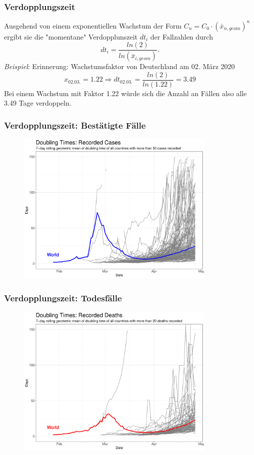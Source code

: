 \documentclass{beamer}
\begin{document}
\begin{frame}
	\frametitle{Verdopplungszeit}
	Ausgehend von einem exponentiellen Wachstum der Form $C_n = C_0 \cdot (\bar{x}_{n, geom})^{n}$ ergibt sie die "momentane" Verdopplunszeit $dt_i$ der Fallzahlen durch $$dt_i = \frac{ln(2)}{ln(\bar{x}_{i, geom})}.$$
	\pause
	\emph{Beispiel}: Erinnerung: Wachstumsfaktor von Deutschland am 02. März 2020 $$x_{02.03.} = 1.22 \Rightarrow dt_{02.03.} = \frac{ln(2)}{ln(1.22)} = 3.49$$ 
	\pause
	Bei einem Wachstum mit Faktor 1.22 würde sich die Anzahl an Fällen also alle 3.49 Tage verdoppeln.
	
\end{frame}

\begin{frame}
	\frametitle{Verdopplungszeit: Bestätigte Fälle}
	\begin{figure}
		\centering
		\includegraphics[width = 270pt]{DT_confirmed}
	\end{figure}
\end{frame}

\begin{frame}
	\frametitle{Verdopplungszeit: Todesfälle}
	\begin{figure}
		\centering
		\includegraphics[width = 270pt]{DT_deaths}
	\end{figure}
\end{frame}
\end{document}
